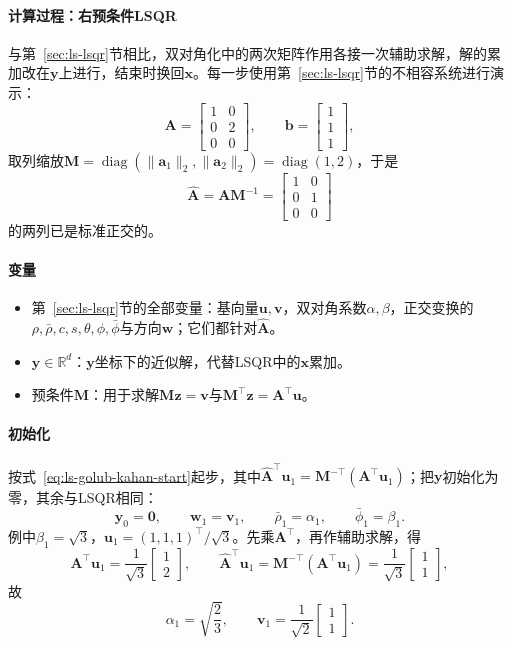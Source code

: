 \paragraph{计算过程：右预条件LSQR}
与第~\ref{sec:ls-lsqr}节相比，双对角化中的两次矩阵作用各接一次辅助求解，解的累加改在$\bm y$上进行，结束时换回$\bm x$。每一步使用第~\ref{sec:ls-lsqr}节的不相容系统进行演示：
\[
 \bm A=\begin{bmatrix}1&0\\0&2\\0&0\end{bmatrix},\qquad
 \bm b=\begin{bmatrix}1\\1\\1\end{bmatrix},
\]
取列缩放$\bm M=\operatorname{diag}(\lVert\bm a_1\rVert_2,\lVert\bm a_2\rVert_2)=\operatorname{diag}(1,2)$，于是
\[
 \widehat{\bm A}=\bm A\bm M^{-1}=\begin{bmatrix}1&0\\0&1\\0&0\end{bmatrix}
\]
的两列已是标准正交的。

\paragraph{变量}
\begin{itemize}
 \item 第~\ref{sec:ls-lsqr}节的全部变量：基向量$\bm u,\bm v$，双对角系数$\alpha,\beta$，正交变换的$\rho,\bar\rho,c,s,\theta,\phi,\bar\phi$与方向$\bm w$；它们都针对$\widehat{\bm A}$。
 \item $\bm y\in\mathbb R^d$：$\bm y$坐标下的近似解，代替LSQR中的$\bm x$累加。
 \item 预条件$\bm M$：用于求解$\bm M\bm z=\bm v$与$\bm M^\top\bm z=\bm A^\top\bm u$。
\end{itemize}

\paragraph{初始化}
按式~\eqref{eq:ls-golub-kahan-start}起步，其中$\widehat{\bm A}^\top\bm u_1=\bm M^{-\top}(\bm A^\top\bm u_1)$；把$\bm y$初始化为零，其余与LSQR相同：
\[
 \bm y_0=\bm 0,\qquad \bm w_1=\bm v_1,\qquad \bar\rho_1=\alpha_1,\qquad \bar\phi_1=\beta_1 .
\]
例中$\beta_1=\sqrt3$，$\bm u_1=(1,1,1)^\top/\sqrt3$。先乘$\bm A^\top$，再作辅助求解，得
\[
 \bm A^\top\bm u_1=\frac1{\sqrt3}\begin{bmatrix}1\\2\end{bmatrix},\qquad
 \widehat{\bm A}^\top\bm u_1=\bm M^{-\top}(\bm A^\top\bm u_1)=\frac1{\sqrt3}\begin{bmatrix}1\\1\end{bmatrix},
\]
故
\[
 \alpha_1=\sqrt{\frac23},\qquad \bm v_1=\frac1{\sqrt2}\begin{bmatrix}1\\1\end{bmatrix}.
\]

